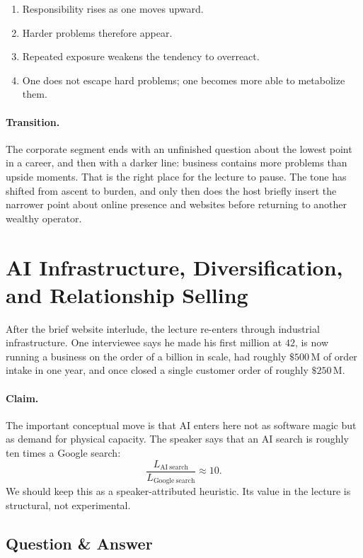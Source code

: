 \begin{enumerate}
\item Responsibility rises as one moves upward.
\item Harder problems therefore appear.
\item Repeated exposure weakens the tendency to overreact.
\item One does not escape hard problems; one becomes more able to metabolize them.
\end{enumerate}

\paragraph{Transition.} The corporate segment ends with an unfinished question about the lowest point in a career, and then with a darker line: business contains more problems than upside moments. That is the right place for the lecture to pause. The tone has shifted from ascent to burden, and only then does the host briefly insert the narrower point about online presence and websites before returning to another wealthy operator.

\section{AI Infrastructure, Diversification, and Relationship Selling}

After the brief website interlude, the lecture re-enters through industrial infrastructure. One interviewee says he made his first million at \(42\), is now running a business on the order of a billion in scale, had roughly \(\$500\,\mathrm{M}\) of order intake in one year, and once closed a single customer order of roughly \(\$250\,\mathrm{M}\).

\paragraph{Claim.} The important conceptual move is that AI enters here not as software magic but as demand for physical capacity. The speaker says that an AI search is roughly ten times a Google search:
\begin{equation}
\frac{L_{\mathrm{AI\ search}}}{L_{\mathrm{Google\ search}}}\approx 10.
\end{equation}
We should keep this as a speaker-attributed heuristic. Its value in the lecture is structural, not experimental.

\subsection{Question \& Answer}

